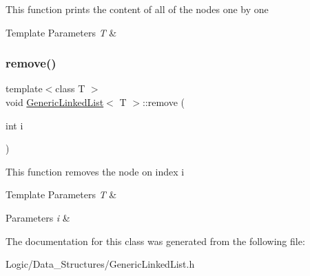 This function prints the content of all of the nodes one by one 
\begin{DoxyTemplParams}{Template Parameters}
{\em T} & \\
\hline
\end{DoxyTemplParams}
\mbox{\label{class_generic_linked_list_aa22b730a9dfd611f0ba6c0704f5125b5}} 
\subsubsection{\texorpdfstring{remove()}{remove()}}
{\footnotesize\ttfamily template$<$class T $>$ \\
void \mbox{\hyperlink{class_generic_linked_list}{Generic\+Linked\+List}}$<$ T $>$\+::remove (\begin{DoxyParamCaption}\item[{int}]{i }\end{DoxyParamCaption})}

This function removes the node on index i 
\begin{DoxyTemplParams}{Template Parameters}
{\em T} & \\
\hline
\end{DoxyTemplParams}

\begin{DoxyParams}{Parameters}
{\em i} & \\
\hline
\end{DoxyParams}


The documentation for this class was generated from the following file\+:\begin{DoxyCompactItemize}
\item 
Logic/\+Data\+\_\+\+Structures/Generic\+Linked\+List.\+h\end{DoxyCompactItemize}

